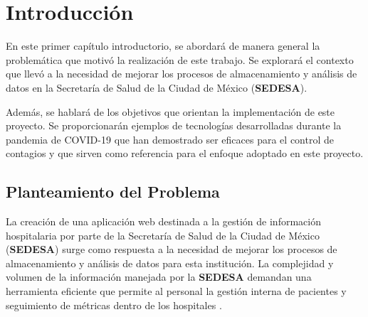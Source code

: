 \chapter{\bf{Introducción}}\label{cap:intro}


En este primer capítulo introductorio, se abordará de manera general la problemática que motivó la realización de este trabajo. Se explorará el contexto que llevó a la necesidad de mejorar los procesos de almacenamiento y análisis de datos en la Secretaría de Salud de la Ciudad de México (\textbf{SEDESA}).

Además, se hablará de los objetivos  que orientan la implementación de este proyecto. Se proporcionarán ejemplos de tecnologías desarrolladas durante la pandemia de COVID-19 que han demostrado ser eficaces para el control de contagios y que sirven como referencia para el enfoque adoptado en este proyecto.


\section{Planteamiento del Problema}\label{intro_mot}

La creación de una aplicación web destinada a la gestión de información hospitalaria por parte de la Secretaría de Salud de la Ciudad de México (\textbf{SEDESA}) surge como respuesta a la necesidad de mejorar los procesos de almacenamiento y análisis de datos para esta institución. La complejidad y volumen de la información manejada por la \textbf{SEDESA} demandan una herramienta eficiente que permite al personal la gestión interna de pacientes y seguimiento de métricas dentro de los hospitales \cite{morales2019sistema}.

